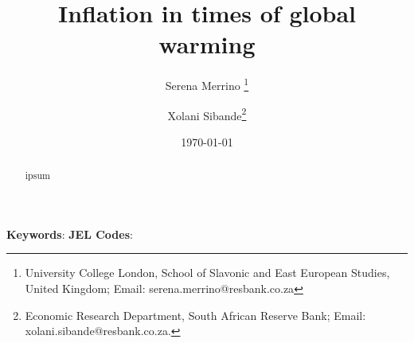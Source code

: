 \title{Inflation in times of global warming}


\author {Serena Merrino \footnote{University College London, School of Slavonic and East European Studies, United Kingdom; Email: serena.merrino@resbank.co.za} \and
Xolani Sibande\footnote{Economic Research Department, South African Reserve Bank; Email: xolani.sibande@resbank.co.za.}
}


\date{\today}
\maketitle

\begin{abstract}
ipsum

\end{abstract}

\noindent\textbf{Keywords}:
\textbf{JEL Codes}:
\newpage
